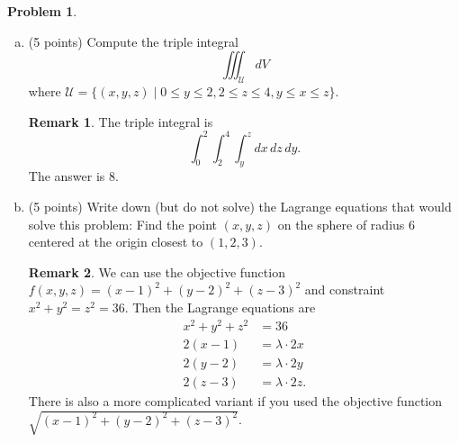 \documentclass[11pt,oneside]{amsart}
\theoremstyle{definition}
\newtheorem{problem}{Problem}
\newtheorem*{remark}{Remark}
\theoremstyle{plain}
\begin{document}
\newpage

\begin{problem}\leavevmode
  \begin{enumerate}[(a)]
    \item (5 points) Compute the triple integral
    \[\iiint_{\mathcal U}dV\]
    where $\mathcal U=\{(x,y,z)\mid 0\leq y\leq 2,2\leq z\leq 4, y\leq x\leq z\}$.
    \begin{remark}\color{blue}
      The triple integral is
      \[\int_0^2\int_2^4\int_y^z dx\,dz\,dy.\]
      The answer is 8.
    \end{remark}
    \vfill
    \item (5 points) Write down (but do not solve) the Lagrange equations that would solve this problem: Find the point $(x,y,z)$ on the sphere of radius 6 centered at the origin closest to $(1,2,3)$.
    \begin{remark}\color{blue}
      We can use the objective function $f(x,y,z)=(x-1)^2+(y-2)^2+(z-3)^2$ and constraint $x^2+y^2=z^2=36$. Then the Lagrange equations are
      \begin{align*}
        x^2+y^2+z^2 &= 36\\
        2(x-1)&=\lambda\cdot 2x\\
        2(y-2)&=\lambda\cdot 2y\\
        2(z-3)&=\lambda\cdot 2z.
      \end{align*}
      There is also a more complicated variant if you used the objective function \\$\sqrt{(x-1)^2+(y-2)^2+(z-3)^2}$.
    \end{remark}
    \vfill
  \end{enumerate}
\end{problem}

\newpage
\end{document}
